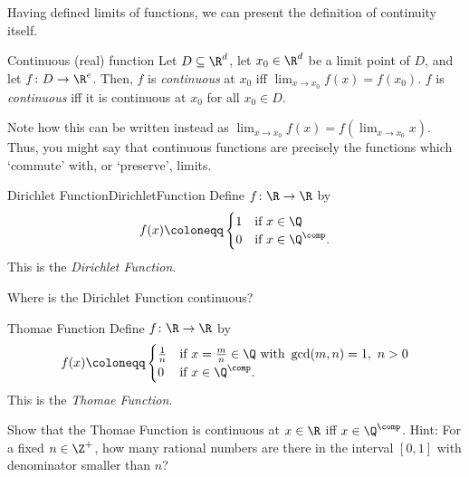 Having defined limits of functions, we can present the definition of continuity itself.
\begin{dfn}{Continuous (real) function}{}
Let $D\subseteq \R ^d$, let $x_0\in \R ^d$ be a limit point of $D$, and let $f\colon D\rightarrow \R ^e$.  Then, $f$ is \emph{continuous} at $x_0$ iff $\lim _{x\to x_0}f(x)=f(x_0)$.  $f$ is \emph{continuous} iff it is continuous at $x_0$ for all $x_0\in D$.
\begin{rmk}
Note how this can be written instead as $\lim _{x\to x_0}f(x)=f(\lim _{x\to x_0}x)$.  Thus, you might say that continuous functions are precisely the functions which `commute' with, or `preserve', limits.
\end{rmk}
\end{dfn}
\begin{exm}{Dirichlet Function}{DirichletFunction}
Define $f\colon \R \rightarrow \R$ by
\begin{equation}
f(x)\coloneqq \begin{cases}1 & \text{if }x\in \Q \\ 0 & \text{if }x\in \Q ^{\comp}.\end{cases}
\end{equation}
This is the \emph{Dirichlet Function}.
\begin{exr}[breakable=false]{}{}
Where is the Dirichlet Function continuous?
\end{exr}
\end{exm}
\begin{exm}{Thomae Function}{}
Define $f\colon \R \rightarrow \R$ by
\begin{equation}
f(x)\coloneqq \begin{cases}\tfrac{1}{n} & \text{if }x=\tfrac{m}{n}\in \Q \text{ with }\gcd (m,n)=1,\ n>0 \\ 0 & \text{if }x\in \Q ^{\comp}.\end{cases}
\end{equation}
This is the \emph{Thomae Function}.
\begin{exr}[breakable=false]{}{}
Show that the Thomae Function is continuous at $x\in \R$ iff $x\in \Q ^{\comp}$.  Hint:  For a fixed $n\in \Z ^+$, how many rational numbers are there in the interval $[0,1]$ with denominator smaller than $n$?
\end{exr}
\end{exm}

